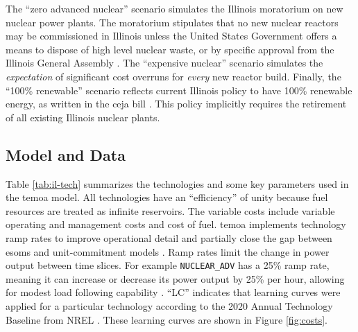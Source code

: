 \begin{table}[H]
  \centering
  \caption{Summary of Illinois Case Study Scenarios}
  \label{tab:il-scenarios}
\end{table}

The ``zero advanced nuclear'' scenario simulates the Illinois moratorium on new nuclear
power plants. The moratorium stipulates that no new nuclear reactors may be
commissioned in Illinois unless the United States Government offers a means to
dispose of high level nuclear waste, or by specific approval from the Illinois
General Assembly \cite{shea_states_2021}. The ``expensive nuclear'' scenario
simulates the \textit{expectation} of significant cost overruns for \textit{every}
new reactor build. Finally, the ``100\% renewable'' scenario reflects current
Illinois policy to have 100\% renewable energy, as written in the \gls{ceja} bill
\cite{harmon_climate_2021}. This policy implicitly requires the retirement of
all existing Illinois nuclear plants.

\subsection{Model and Data}

Table \ref{tab:il-tech} summarizes the technologies and some key parameters
used in the \gls{temoa} model. All technologies have an ``efficiency'' of unity
because fuel resources are treated as infinite reservoirs. The variable costs
include variable operating and management costs and cost of fuel. \gls{temoa}
implements technology ramp rates to improve operational detail and partially
close the gap between \glspl{esom} and unit-commitment models \cite{de_queiroz_repurposing_2019}.
Ramp rates limit the change in power output between time slices. For example
\texttt{NUCLEAR\_ADV} has a 25\% ramp rate, meaning it can increase or decrease
its power output by 25\% per hour, allowing for modest load following capability
\cite{baseload_2017,lokhov_technical_2011}. ``LC'' indicates that learning
curves were applied for a particular technology according to the 2020 Annual Technology
Baseline from NREL \cite{nrel_2020_2020}. These learning curves are shown in
Figure \ref{fig:costs}.

